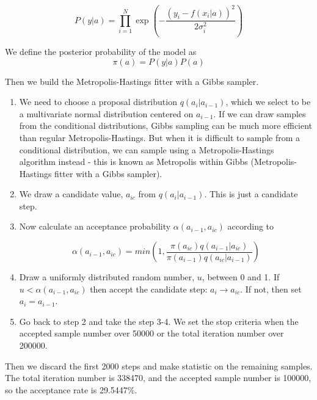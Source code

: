 \documentclass[12pt]{article}
\begin{document}
\begin{equation}
P(y|a)=\prod_{i=1}^{N} \exp (-\frac{(y_{i}-f(x_{i}|a))^{2}}{2\sigma _{i}^{2}})
\end{equation}

We define the posterior probability of the model as
\begin{equation}
\pi (a)=P(y|a)P(a)
\end{equation}


Then we build the Metropolis-Hastings fitter with a Gibbs sampler.
\begin{enumerate}[1.]

\item We need to choose a proposal distribution $q(a_{i}|a_{i-1})$, which we select to be a multivariate normal distribution centered on $a_{i-1}$. If we can draw samples from the conditional distributions, Gibbs sampling can be much more efficient than regular Metropolis-Hastings. But when it is difficult to sample from a conditional distribution, we can sample using a Metropolis-Hastings algorithm instead - this is known as Metropolis within Gibbs (Metropolis-Hastings fitter with a Gibbs sampler).

\item We draw a candidate value, $a_{ic}$ from $q(a_{i}|a_{i-1})$. This is just a candidate step.

\item Now calculate an acceptance probability $\alpha (a_{i-1},a_{ic})$ according to

\begin{equation}
\alpha (a_{i-1},a_{ic})=min(1,\frac{\pi(a_{ic})q(a_{i-1}|a_{ic})}{\pi(a_{i-1})q(a_{ic}|a_{i-1})})
\end{equation}

\item Draw a uniformly distributed random number, $u$, between 0 and 1. If $u < \alpha (a_{i-1},a_{ic})$
then accept the candidate step: $a_{i} \rightarrow a_{ic}$. If not, then set $a_{i} = a_{i-1}$.

\item Go back to step 2 and take the step 3-4. We set the stop criteria when the accepted sample number over 50000 or the total iteration number over 200000. 

\end{enumerate}


Then we discard the first 2000 steps and make statistic on the remaining samples. The total iteration number is 338470, and the accepted sample number is 100000, so the acceptance rate is 29.5447\%.
 
\end{document}
